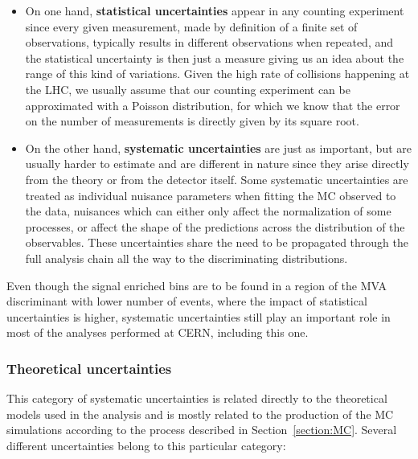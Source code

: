 \documentclass[a4paper, 10pt, openright]{report}
\begin{document}
\begin{itemize}
\item On one hand, \textbf{statistical uncertainties} appear in any counting experiment \cite {statistical} since every given measurement, made by definition of a finite set of observations, typically results in different observations when repeated, and the statistical uncertainty is then just a measure giving us an idea about the range of this kind of variations. Given the high rate of collisions happening at the \ac{LHC}, we usually assume that our counting experiment can be approximated with a Poisson distribution, for which we know that the error on the number of measurements is directly given by its square root.
\item On the other hand, \textbf{systematic uncertainties} are just as important, but are usually harder to estimate and are different in nature \cite{systematics} since they arise directly from the theory or from the detector itself. Some systematic uncertainties are treated as individual nuisance parameters when fitting the \ac{MC} observed to the data, nuisances which can either only affect the normalization of some processes, or affect the shape of the predictions across the distribution of the observables. These uncertainties share the need to be propagated through the full analysis chain all the way to the discriminating distributions.
\end{itemize}

Even though the signal enriched bins are to be found in a region of the \ac{MVA} discriminant with lower number of events, where the impact of statistical uncertainties is higher, systematic uncertainties still play an important role in most of the analyses performed at \ac{CERN}, including this one.

\subsubsection{Theoretical uncertainties}

This category of systematic uncertainties is related directly to the theoretical models used in the analysis and is mostly related to the production of the \ac{MC} simulations according to the process described in Section~\ref{section:MC}. Several different uncertainties belong to this particular category:
\end{document}
